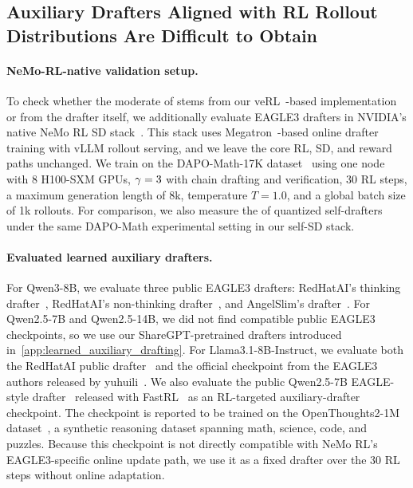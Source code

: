 



\subsection{Auxiliary Drafters Aligned with RL Rollout Distributions Are Difficult to Obtain}
\label{app:workload-matched-auxiliary-drafters}

\paragraph{NeMo-RL-native validation setup.}

To check whether the moderate \MAL{} of \learned{} stems from our veRL~\citep{sheng2025hybridflow}-based implementation or from the drafter itself, we additionally evaluate EAGLE3 drafters in NVIDIA's native NeMo RL SD stack~\citep{iso2026accelerating}.
This stack uses Megatron~\citep{shoeybi2019megatron}-based online drafter training with vLLM rollout serving, and we leave the core RL, SD, and reward paths unchanged.
We train on the DAPO-Math-17K dataset~\citep{yu2025dapo} using one node with 8 H100-SXM GPUs, $\gamma=3$ with chain drafting and verification, 30 RL steps, a maximum generation length of 8k, temperature $T=1.0$, and a global batch size of 1k rollouts.
For comparison, we also measure the \MAL{} of quantized self-drafters under the same DAPO-Math experimental setting in our self-SD stack.

\paragraph{Evaluated learned auxiliary drafters.}

For Qwen3-8B, we evaluate three public EAGLE3 drafters: RedHatAI's thinking drafter~\citep{redhatai2025qwen3eagle3thinking}, RedHatAI's non-thinking drafter~\citep{redhatai2025qwen3eagle3nothink}, and AngelSlim's drafter~\citep{angelslim2025qwen3eagle3}.
For Qwen2.5-7B and Qwen2.5-14B, we did not find compatible public EAGLE3 checkpoints, so we use our ShareGPT-pretrained drafters introduced in~\cref{app:learned_auxiliary_drafting}.
For Llama3.1-8B-Instruct, we evaluate both the RedHatAI public drafter~\citep{redhatai2025llama31eagle3} and the official checkpoint from the EAGLE3 authors released by yuhuili~\citep{yuhuili2024llama31eagle3}.
We also evaluate the public Qwen2.5-7B EAGLE-style drafter~\citep{mithanlab2026qwen25eagle} released with FastRL~\citep{hu2026taming} as an RL-targeted auxiliary-drafter checkpoint.
The checkpoint is reported to be trained on the OpenThoughts2-1M dataset~\citep{openthoughts2026openthoughts2}, a synthetic reasoning dataset spanning math, science, code, and puzzles.
Because this checkpoint is not directly compatible with NeMo RL's EAGLE3-specific online update path, we use it as a fixed drafter over the 30 RL steps without online adaptation.


